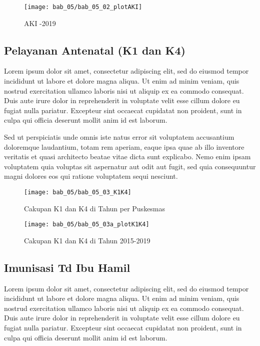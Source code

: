 \begin{figure}[H]
    \centering{}
    \texttt{[image: bab\_05/bab\_05\_02\_plotAKI]}
    \caption{AKI -2019}
    \label{fig:AKI-2015-2019}
\end{figure}

\subsection{Pelayanan Antenatal (K1 dan K4)}
Lorem ipsum dolor sit amet, consectetur adipiscing elit, sed do eiusmod tempor incididunt ut labore et dolore magna aliqua. Ut enim ad minim veniam, quis nostrud exercitation ullamco laboris nisi ut aliquip ex ea commodo consequat. Duis aute irure dolor in reprehenderit in voluptate velit esse cillum dolore eu fugiat nulla pariatur. Excepteur sint occaecat cupidatat non proident, sunt in culpa qui officia deserunt mollit anim id est laborum.

Sed ut perspiciatis unde omnis iste natus error sit voluptatem accusantium doloremque laudantium, totam rem aperiam, eaque ipsa quae ab illo inventore veritatis et quasi architecto beatae vitae dicta sunt explicabo. Nemo enim ipsam voluptatem quia voluptas sit aspernatur aut odit aut fugit, sed quia consequuntur magni dolores eos qui ratione voluptatem sequi nesciunt.

\begin{figure}[H]
    \centering{}
    \texttt{[image: bab\_05/bab\_05\_03\_K1K4]}
    \caption{Cakupan K1 dan K4 di \namaKabupaten Tahun \tP per Puskesmas}
    \label{fig:Cakupan-K1-K4}
\end{figure}

\begin{figure}[H]
    \centering{}
    \texttt{[image: bab\_05/bab\_05\_03a\_plotK1K4]}
    \caption{Cakupan K1 dan K4 di \namaKabupaten Tahun 2015-2019}
    \label{fig:Cakupan-K1-K4-2015-2019}
\end{figure}

\subsection{Imunisasi Td Ibu Hamil}
Lorem ipsum dolor sit amet, consectetur adipiscing elit, sed do eiusmod tempor incididunt ut labore et dolore magna aliqua. Ut enim ad minim veniam, quis nostrud exercitation ullamco laboris nisi ut aliquip ex ea commodo consequat. Duis aute irure dolor in reprehenderit in voluptate velit esse cillum dolore eu fugiat nulla pariatur. Excepteur sint occaecat cupidatat non proident, sunt in culpa qui officia deserunt mollit anim id est laborum.

